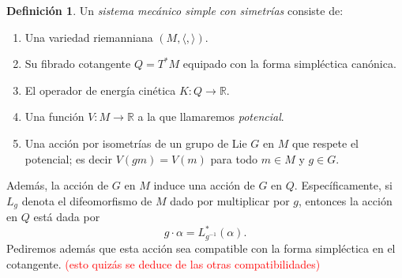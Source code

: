 \documentclass[11pt, a4paper]{article}
\newcommand{\RR}{\mathbb{R}}
\theoremstyle{plain}
\theoremstyle{definition}
\newtheorem{defn}[prop]{Definición}
\begin{document}
\begin{defn} Un \emph{sistema mecánico simple con simetrías} consiste de:
\begin{enumerate}
\item Una variedad riemanniana $(M,\langle, \rangle)$.
\item Su fibrado cotangente $Q=T^*M$ equipado con la forma simpléctica canónica.
\item El operador de energía cinética $K:Q\to \RR$.
\item Una función $V:M\to \RR$ a la que llamaremos \emph{potencial}.
\item Una acción por isometrías de un grupo de Lie $G$ en $M$ que respete el potencial; es decir $V(gm)=V(m)$ para todo $m\in M$ y $g\in G$. 
\end{enumerate}
Además, la acción de $G$ en $M$ induce una acción de $G$ en $Q$. Específicamente, si $L_g$ denota el difeomorfismo de $M$ dado por multiplicar por $g$, entonces la acción en $Q$ está dada por
\[g\cdot \alpha = L_{g^{-1}}^*(\alpha).\]
Pediremos además que esta acción sea compatible con la forma simpléctica en el cotangente. \textcolor{red}{(esto quizás se deduce de las otras compatibilidades)}
\end{defn}
\end{document}
